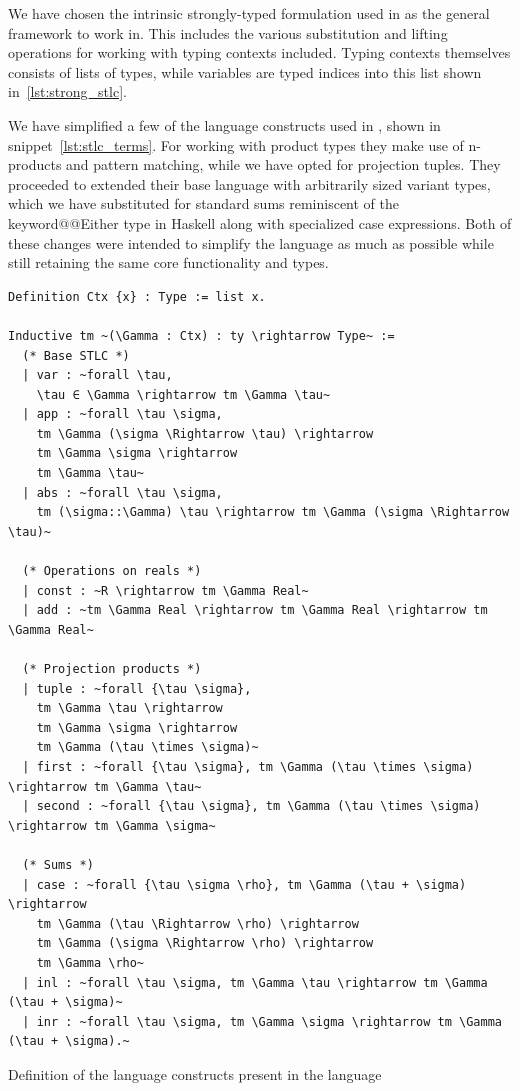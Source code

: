 \documentclass[12pt, final]{article}
\makeatletter
\def\<#1>{\csname keyword@@#1\endcsname}
\makeatother
\begin{document}
We have chosen the intrinsic strongly-typed formulation used in \cite{Benton2011} as the general framework to work in. This includes the various substitution and lifting operations for working with typing contexts included. Typing contexts themselves consists of lists of types, while variables are typed indices into this list shown in~\ref{lst:strong_stlc}.

We have simplified a few of the language constructs used in \cite{huot2020correctness}, shown in snippet~\ref{lst:stlc_terms}. For working with product types they make use of n-products and pattern matching, while we have opted for projection tuples. They proceeded to extended their base language with arbitrarily sized variant types, which we have substituted for standard sums reminiscent of the \<Either> type in Haskell along with specialized case expressions. Both of these changes were intended to simplify the language as much as possible while still retaining the same core functionality and types.

\begin{listing}
  \begin{verbatim}
Definition Ctx {x} : Type := list x.

Inductive tm ~(\Gamma : Ctx) : ty \rightarrow Type~ :=
  (* Base STLC *)
  | var : ~forall \tau,
    \tau ∈ \Gamma \rightarrow tm \Gamma \tau~
  | app : ~forall \tau \sigma,
    tm \Gamma (\sigma \Rightarrow \tau) \rightarrow
    tm \Gamma \sigma \rightarrow
    tm \Gamma \tau~
  | abs : ~forall \tau \sigma,
    tm (\sigma::\Gamma) \tau \rightarrow tm \Gamma (\sigma \Rightarrow \tau)~

  (* Operations on reals *)
  | const : ~R \rightarrow tm \Gamma Real~
  | add : ~tm \Gamma Real \rightarrow tm \Gamma Real \rightarrow tm \Gamma Real~

  (* Projection products *)
  | tuple : ~forall {\tau \sigma},
    tm \Gamma \tau \rightarrow
    tm \Gamma \sigma \rightarrow
    tm \Gamma (\tau \times \sigma)~
  | first : ~forall {\tau \sigma}, tm \Gamma (\tau \times \sigma) \rightarrow tm \Gamma \tau~
  | second : ~forall {\tau \sigma}, tm \Gamma (\tau \times \sigma) \rightarrow tm \Gamma \sigma~

  (* Sums *)
  | case : ~forall {\tau \sigma \rho}, tm \Gamma (\tau + \sigma) \rightarrow
    tm \Gamma (\tau \Rightarrow \rho) \rightarrow
    tm \Gamma (\sigma \Rightarrow \rho) \rightarrow
    tm \Gamma \rho~
  | inl : ~forall \tau \sigma, tm \Gamma \tau \rightarrow tm \Gamma (\tau + \sigma)~
  | inr : ~forall \tau \sigma, tm \Gamma \sigma \rightarrow tm \Gamma (\tau + \sigma).~

  \end{verbatim}
  \caption{Definition of the language constructs present in the language}
  \label{lst:stlc_terms}
\end{listing}
\end{document}
